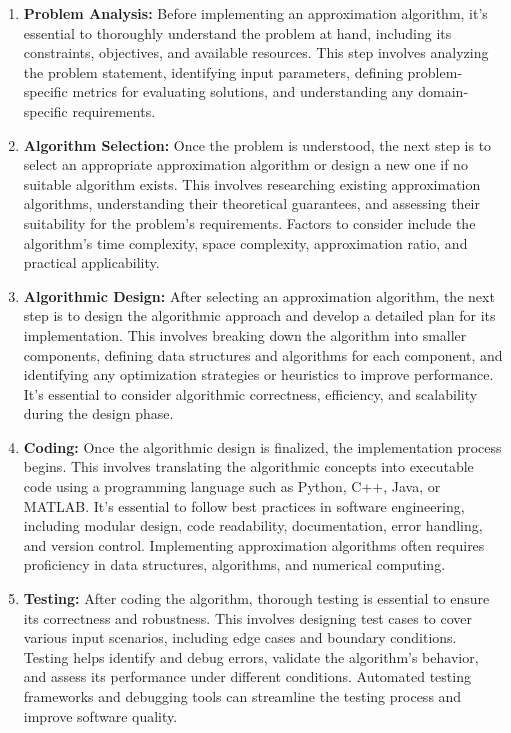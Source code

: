 \documentclass[12pt]{book} %
\begin{document}
\begin{enumerate}
    \item \textbf{Problem Analysis:} Before implementing an approximation algorithm, it's essential to thoroughly understand the problem at hand, including its constraints, objectives, and available resources. This step involves analyzing the problem statement, identifying input parameters, defining problem-specific metrics for evaluating solutions, and understanding any domain-specific requirements.
    
    \item \textbf{Algorithm Selection:} Once the problem is understood, the next step is to select an appropriate approximation algorithm or design a new one if no suitable algorithm exists. This involves researching existing approximation algorithms, understanding their theoretical guarantees, and assessing their suitability for the problem's requirements. Factors to consider include the algorithm's time complexity, space complexity, approximation ratio, and practical applicability.
    
    \item \textbf{Algorithmic Design:} After selecting an approximation algorithm, the next step is to design the algorithmic approach and develop a detailed plan for its implementation. This involves breaking down the algorithm into smaller components, defining data structures and algorithms for each component, and identifying any optimization strategies or heuristics to improve performance. It's essential to consider algorithmic correctness, efficiency, and scalability during the design phase.
    
    \item \textbf{Coding:} Once the algorithmic design is finalized, the implementation process begins. This involves translating the algorithmic concepts into executable code using a programming language such as Python, C++, Java, or MATLAB. It's essential to follow best practices in software engineering, including modular design, code readability, documentation, error handling, and version control. Implementing approximation algorithms often requires proficiency in data structures, algorithms, and numerical computing.
    
    \item \textbf{Testing:} After coding the algorithm, thorough testing is essential to ensure its correctness and robustness. This involves designing test cases to cover various input scenarios, including edge cases and boundary conditions. Testing helps identify and debug errors, validate the algorithm's behavior, and assess its performance under different conditions. Automated testing frameworks and debugging tools can streamline the testing process and improve software quality.
    

\end{enumerate}
\end{document}

